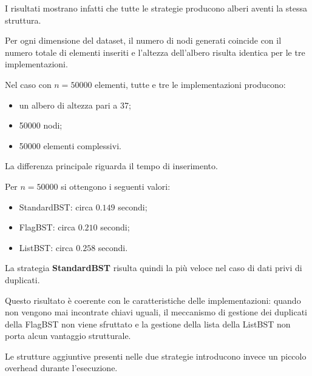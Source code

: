 \documentclass[a4paper,12pt]{article}
\begin{document}
I risultati mostrano infatti che tutte le strategie producono alberi aventi la stessa struttura.

Per ogni dimensione del dataset, il numero di nodi generati coincide con il numero totale di elementi inseriti e l'altezza dell'albero risulta identica per le tre implementazioni.

Nel caso con $n=50000$ elementi, tutte e tre le implementazioni producono:

\begin{itemize}

    \item un albero di altezza pari a 37;

    \item 50000 nodi;

    \item 50000 elementi complessivi.

\end{itemize}

La differenza principale riguarda il tempo di inserimento.

Per $n=50000$ si ottengono i seguenti valori:

\begin{itemize}

    \item StandardBST: circa $0.149$ secondi;

    \item FlagBST: circa $0.210$ secondi;

    \item ListBST: circa $0.258$ secondi.

\end{itemize}

La strategia \textbf{StandardBST} risulta quindi la più veloce nel caso di dati privi di duplicati.

Questo risultato è coerente con le caratteristiche delle implementazioni: quando non vengono mai incontrate chiavi uguali, il meccanismo di gestione dei duplicati della FlagBST non viene sfruttato e la gestione della lista della ListBST non porta alcun vantaggio strutturale.

Le strutture aggiuntive presenti nelle due strategie introducono invece un piccolo overhead durante l'esecuzione.
\end{document}

